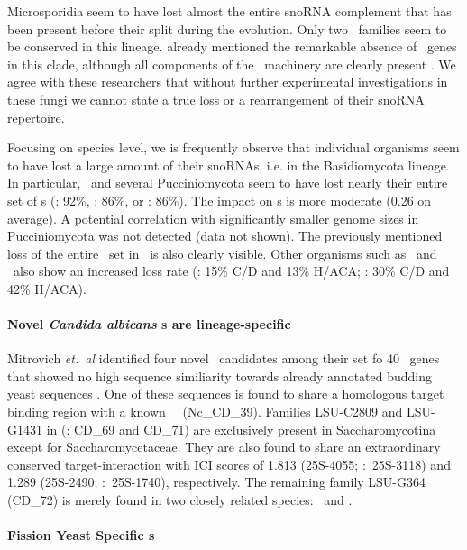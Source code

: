 Microsporidia seem to have lost almost the entire snoRNA complement
that has been present before their split during the evolution.  Only
two \cd\ families seem to be conserved in this lineage.
\citet{Gardner:2010} already mentioned the remarkable absence of \sno\ genes
in this clade, although all components of the \sno\ machinery are
clearly present \cite{Gardner:2010}.  We agree with these researchers
that without further experimental investigations in these fungi we
cannot state a true loss or a rearrangement of their snoRNA
repertoire.

Focusing on species level, we is frequently observe that individual 
organisms seem to have lost a large amount of their snoRNAs, i.e. in
the Basidiomycota lineage.  In particular, \wse\ and several
Pucciniomycota seem to have lost nearly their entire set of \haca s
(\wse: 92\%, \rmi: 86\%, or \sli: 86\%). The impact on \cd s is more
moderate (0.26  on average). A potential correlation with significantly
smaller genome sizes in Pucciniomycota was not detected (data not
shown). The previously mentioned loss of the entire \haca\ set in
\Ptt\ is also clearly visible. Other organisms such as \pan\ and \opi\
also show an increased loss rate (\pan: 15\% C/D and 13\% H/ACA; \opi:
30\% C/D and 42\% H/ACA).

\paragraph{\textbf{Novel \emph{Candida albicans} \sno s are lineage-specific}}

Mitrovich \emph{et.~al} identified four novel \sno\ candidates among
their set fo 40 \sno\ genes that showed no high sequence similiarity
towards already annotated budding yeast sequences
\cite{Mitrovich:2010}. One of these sequences is found to share a
homologous target binding region with a known \ncr\ \sno\
(Nc\_CD\_39). Families LSU-C2809 and LSU-G1431 in
\cite{Mitrovich:2010} (\snostrip: CD\_69 and CD\_71) are exclusively
present in Saccharomycotina except for Saccharomycetaceae. They are
also found to share an extraordinary conserved target-interaction with
ICI scores of 1.813 (25S-4055; \calb:~25S-3118) and 1.289 (25S-2490;
\calb:~25S-1740), respectively. The remaining family LSU-G364 (CD\_72)
is merely found in two closely related species: \cdu\ and \ctr.

\paragraph{\textbf{Fission Yeast Specific \sno s}}

